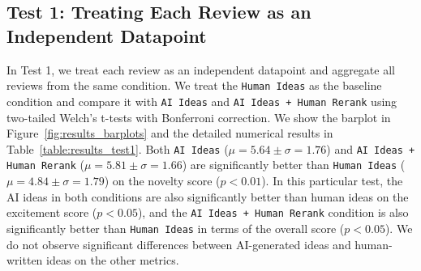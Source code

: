 





\subsection{Test 1: Treating Each Review as an Independent Datapoint}
\label{sec:test1}

In Test 1, we treat each review as an independent datapoint and aggregate all reviews from the same condition.
We treat the \texttt{Human Ideas} as the baseline condition and compare it with \texttt{AI Ideas} and \texttt{AI Ideas + Human Rerank} using two-tailed Welch’s t-tests with Bonferroni correction. 
We show the barplot in Figure~\ref{fig:results_barplots} and the detailed numerical results in Table~\ref{table:results_test1}.
Both \texttt{AI Ideas} ($\mu = 5.64 \pm \sigma = 1.76$) and \texttt{AI Ideas + Human Rerank} ($\mu = 5.81 \pm \sigma = 1.66$) are significantly better than \texttt{Human Ideas} ($\mu = 4.84 \pm \sigma = 1.79$) on the novelty score ($p<0.01$).
In this particular test, the AI ideas in both conditions are also significantly better than human ideas on the excitement score ($p<0.05$), and the \texttt{AI Ideas + Human Rerank} condition is also significantly better than \texttt{Human Ideas} in terms of the overall score ($p<0.05$). 
We do not observe significant differences between AI-generated ideas and human-written ideas on the other metrics. 



